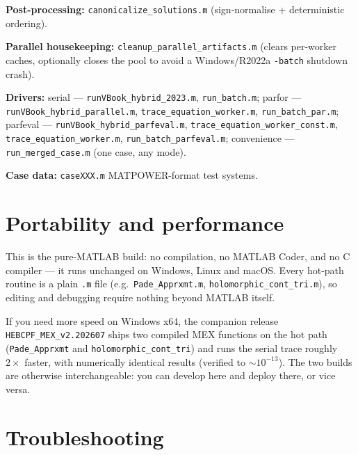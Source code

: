 \documentclass[11pt,a4paper]{article}
\newcommand{\code}[1]{\texttt{#1}}
\begin{document}
\textbf{Post-processing:} \code{canonicalize_solutions.m} (sign-normalise + deterministic
ordering).

\textbf{Parallel housekeeping:} \code{cleanup_parallel_artifacts.m} (clears per-worker
caches, optionally closes the pool to avoid a Windows/R2022a \code{-batch} shutdown
crash).

\textbf{Drivers:}
serial --- \code{runVBook_hybrid_2023.m}, \code{run_batch.m};
parfor --- \code{runVBook_hybrid_parallel.m}, \code{trace_equation_worker.m},
\code{run_batch_par.m};
parfeval --- \code{runVBook_hybrid_parfeval.m}, \code{trace_equation_worker_const.m},
\code{trace_equation_worker.m}, \code{run_batch_parfeval.m};
convenience --- \code{run_merged_case.m} (one case, any mode).

\textbf{Case data:} \code{caseXXX.m} MATPOWER-format test systems.

\section{Portability and performance}

This is the pure-MATLAB build: no compilation, no MATLAB Coder, and no C compiler --- it
runs unchanged on Windows, Linux and macOS. Every hot-path routine is a plain \code{.m}
file (e.g.\ \code{Pade_Apprxmt.m}, \code{holomorphic_cont_tri.m}), so editing and
debugging require nothing beyond MATLAB itself.

If you need more speed on Windows x64, the companion release \code{HEBCPF_MEX_v2.202607}
ships two compiled MEX functions on the hot path (\code{Pade_Apprxmt} and
\code{holomorphic_cont_tri}) and runs the serial trace roughly $2\times$ faster, with
numerically identical results (verified to $\sim 10^{-13}$). The two builds are otherwise
interchangeable: you can develop here and deploy there, or vice versa.

\section{Troubleshooting}
\end{document}
